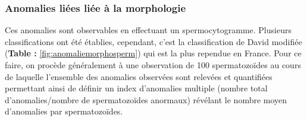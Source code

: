 \documentclass[12pt,twoside]{reedthesis}
\theoremstyle{definition}
\theoremstyle{definition}
\theoremstyle{remark}
\begin{document}
  \subsubsection{Anomalies liées liée à la
  morphologie}\label{anomalies-liees-liee-a-la-morphologie}
  
  Ces anomalies sont observables en effectuant un spermocytogramme.
  Plusieurs classifications ont été établies, cependant, c'est la
  classification de David modifiée (\textbf{Table :}
  \ref{fig:anomaliemorphosperm}) qui est la plus rependue en France. Pour
  ce faire, on procède généralement à une observation de 100
  spermatozoïdes au cours de laquelle l'ensemble des anomalies observées
  sont relevées et quantifiées permettant ainsi de définir un index
  d'anomalies multiple (nombre total d'anomalies/nombre de spermatozoïdes
  anormaux) révélant le nombre moyen d'anomalies par spermatozoïdes.
  
\end{document}
